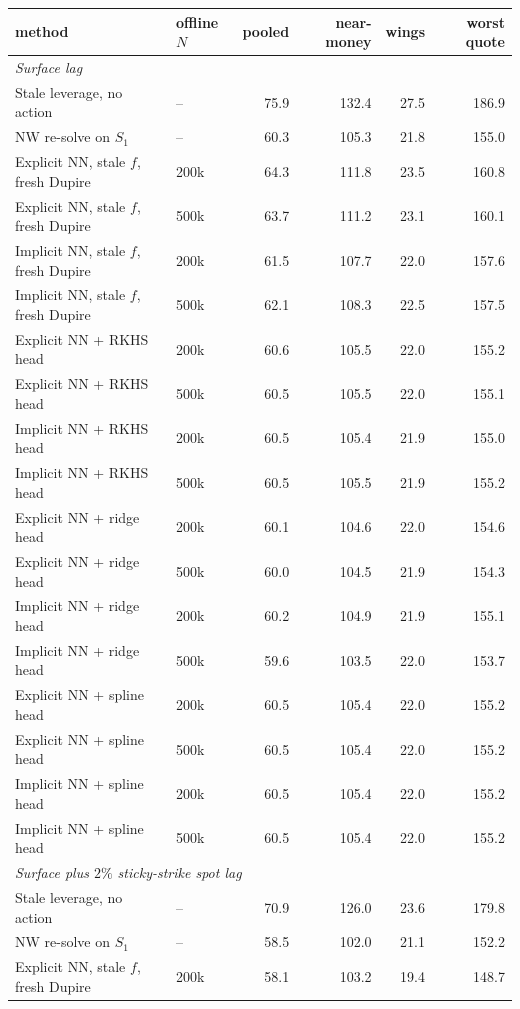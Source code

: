 \begin{tabular}{l l rrrr}
\toprule
method & offline $N$ & pooled & near-money & wings & worst quote\\
\midrule
\multicolumn{6}{l}{\emph{Surface lag}}\\
Stale leverage, no action & -- & 75.9 & 132.4 & 27.5 & 186.9\\
NW re-solve on $S_1$ & -- & 60.3 & 105.3 & 21.8 & 155.0\\
Explicit NN, stale $f$, fresh Dupire & 200k & 64.3 & 111.8 & 23.5 & 160.8\\
Explicit NN, stale $f$, fresh Dupire & 500k & 63.7 & 111.2 & 23.1 & 160.1\\
Implicit NN, stale $f$, fresh Dupire & 200k & 61.5 & 107.7 & 22.0 & 157.6\\
Implicit NN, stale $f$, fresh Dupire & 500k & 62.1 & 108.3 & 22.5 & 157.5\\
Explicit NN + RKHS head & 200k & 60.6 & 105.5 & 22.0 & 155.2\\
Explicit NN + RKHS head & 500k & 60.5 & 105.5 & 22.0 & 155.1\\
Implicit NN + RKHS head & 200k & 60.5 & 105.4 & 21.9 & 155.0\\
Implicit NN + RKHS head & 500k & 60.5 & 105.5 & 21.9 & 155.2\\
Explicit NN + ridge head & 200k & 60.1 & 104.6 & 22.0 & 154.6\\
Explicit NN + ridge head & 500k & 60.0 & 104.5 & 21.9 & 154.3\\
Implicit NN + ridge head & 200k & 60.2 & 104.9 & 21.9 & 155.1\\
Implicit NN + ridge head & 500k & 59.6 & 103.5 & 22.0 & 153.7\\
Explicit NN + spline head & 200k & 60.5 & 105.4 & 22.0 & 155.2\\
Explicit NN + spline head & 500k & 60.5 & 105.4 & 22.0 & 155.2\\
Implicit NN + spline head & 200k & 60.5 & 105.4 & 22.0 & 155.2\\
Implicit NN + spline head & 500k & 60.5 & 105.4 & 22.0 & 155.2\\
\midrule
\multicolumn{6}{l}{\emph{Surface plus $2\%$ sticky-strike spot lag}}\\
Stale leverage, no action & -- & 70.9 & 126.0 & 23.6 & 179.8\\
NW re-solve on $S_1$ & -- & 58.5 & 102.0 & 21.1 & 152.2\\
Explicit NN, stale $f$, fresh Dupire & 200k & 58.1 & 103.2 & 19.4 & 148.7\\

\end{tabular}
